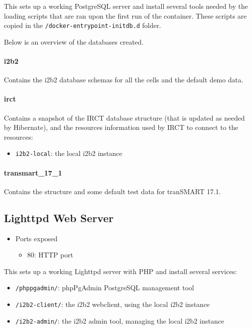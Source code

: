 This sets up a working PostgreSQL server and install several tools needed by the loading scripts that are ran upon the first run of the container.
These scripts are copied in the \verb|/docker-entrypoint-initdb.d| folder.

Below is an overview of the databases created.

\paragraph{i2b2}
Contains the i2b2 database schemas for all the cells and the default demo data.

\paragraph{irct}
Contains a snapshot of the IRCT database structure (that is updated as needed by Hibernate), and the resources information used by IRCT to connect to the resources:

\begin{itemize}
    \item \verb|i2b2-local|: the local i2b2 instance
\end{itemize}

\paragraph{transmart\_17\_1}
Contains the structure and some default test data for tranSMART 17.1.
    
\subsection{Lighttpd Web Server}

\begin{itemize}
    \item Ports exposed
        \begin{itemize}
        \item 80: HTTP port
        \end{itemize}
\end{itemize}

This sets up a working Lighttpd server with PHP and install several services:
\begin{itemize}
    \item \verb|/phppgadmin/|: phpPgAdmin PostgreSQL management tool
    \item \verb|/i2b2-client/|: the i2b2 webclient, using the local i2b2 instance
    \item \verb|/i2b2-admin/|: the i2b2 admin tool, managing the local i2b2 instance
\end{itemize}


